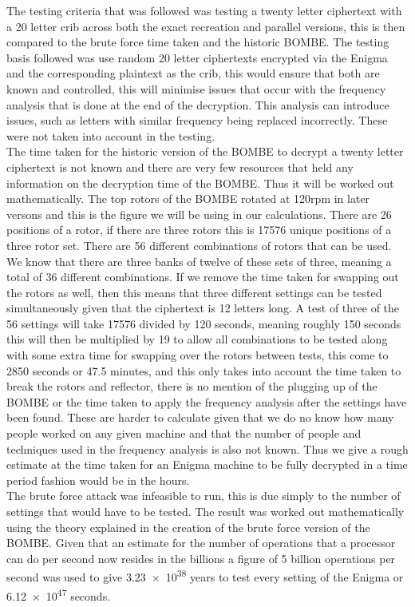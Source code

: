 \documentclass[12pt,a4paper]{article}
\begin{document}
The testing criteria that was followed was testing a twenty letter ciphertext with a 20 letter crib across both the exact recreation and parallel versions, this is then compared to the brute force time taken and the historic BOMBE. The testing basis followed was use random 20 letter ciphertexts encrypted via the Enigma and the corresponding plaintext as the crib, this would ensure that both are known and controlled, this will minimise issues that occur with the frequency analysis that is done at the end of the decryption. This analysis can introduce issues, such as letters with similar frequency being replaced incorrectly. These were not taken into account in the testing.\\

The time taken for the historic version of the BOMBE to decrypt a twenty letter ciphertext is not known and there are very few resources that held any information on the decryption time of the BOMBE. Thus it will be worked out mathematically. The top rotors of the BOMBE rotated at 120rpm in later versons and this is the figure we will be using in our calculations. There are 26 positions of a rotor, if there are three rotors this is 17576 unique positions of a three rotor set. There are 56 different combinations of rotors that can be used. We know that there are three banks of twelve of these sets of three, meaning a total of 36 different combinations. If we remove the time taken for swapping out the rotors as well, then this means that three different settings can be tested simultaneously given that the ciphertext is 12 letters long. A test of three of the 56 settings will take 17576 divided by 120 seconds, meaning roughly 150 seconds this will then be multiplied by 19 to allow all combinations to be tested along with some extra time for swapping over the rotors between tests, this come to 2850 seconds or 47.5 minutes, and this only takes into account the time taken to break the rotors and reflector, there is no mention of the plugging up of the BOMBE or the time taken to apply the frequency analysis after the settings have been found. These are harder to calculate given that we do no know how many people worked on any given machine and that the number of people and techniques used in the frequency analysis is also not known. Thus we give a rough estimate at the time taken for an Enigma machine to be fully decrypted in a time period fashion would be in the hours.\\

The brute force attack was infeasible to run, this is due simply to the number of settings that would have to be tested. The result was worked out mathematically using the theory explained in the creation of the brute force version of the BOMBE. Given that an estimate for the number of operations that a processor can do per second now resides in the billions a figure of 5 billion operations per second was used to give  \num{3.23e38} years to test every setting of the Enigma or  \num{6.12e47} seconds.\\
\end{document}
